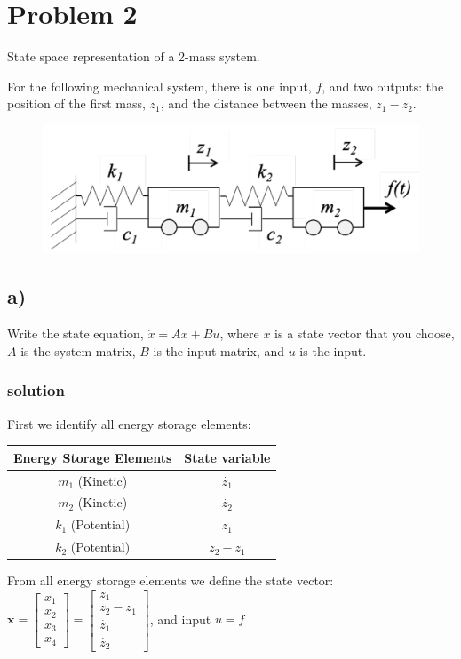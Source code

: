 \section{Problem 2}
State space representation of a 2-mass system.

For the following mechanical system, there is one input, $f$, and two outputs: the position of the first mass, $z_1$, and the distance between the masses, $z_1 - z_2$.

\begin{figure}[htp]
    \centering
    \includegraphics[width=15cm]{images/Q2.png}
\end{figure}

\subsection{a)}
Write the state equation, $\dot{x}=Ax+Bu$, where $x$ is a state vector that you choose, $A$ is the system matrix, $B$ is the input matrix, and $u$ is the input.
\subsubsection{solution}

First we identify all energy storage elements:

\begin{table}[ht]
    \centering
    \begin{tabular}{c | c}
        Energy Storage Elements & State variable
        \\
        \hline
        $m_1$ (Kinetic) & $\dot{z_1}$ \\
        $m_2$ (Kinetic) & $\dot{z_2}$ \\
        $k_1$ (Potential) & $z_1$ \\
        $k_2$ (Potential) & $z_2 - z_1$
    \end{tabular}
\end{table}

From all energy storage elements we define the state vector: $\textbf{x} = 
\begin{bmatrix}
    x_1\\
    x_2\\ 
    x_3\\ 
    x_4
\end{bmatrix} = 
\begin{bmatrix}
    z_1\\
    z_2 - z_1\\ 
    \dot{z_1}\\ 
    \dot{z_2}
\end{bmatrix}$, and input $u = f$

